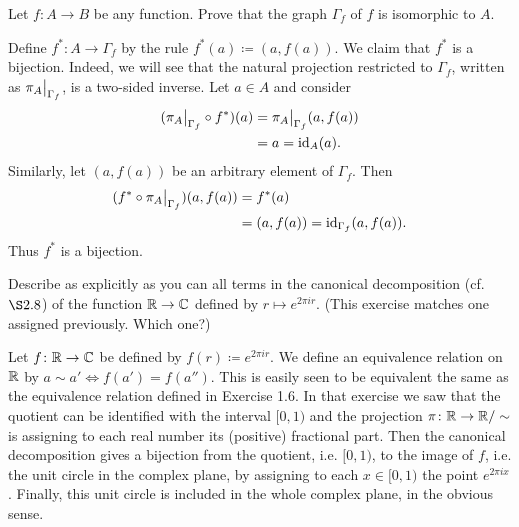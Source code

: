 \begin{exercise}
	Let \(f \colon A \to B\) be any function. Prove that the graph \(\Gamma_f\) of \(f\) is isomorphic to \(A\).
\end{exercise}
\begin{solution}
	Define $f^*\colon A \to \Gamma_f$ by the rule $f^*(a) \coloneqq (a,f(a))$. We claim that $f^*$ is a bijection. Indeed, we will see that the natural projection restricted to $\Gamma_f$, written as $\restr{\pi_A}{\Gamma_f}$, is a two-sided inverse. Let $a\in A$ and consider
	\begin{align*}
		(\restr{\pi_A}{\Gamma_f} \circ f^*)(a) &= \restr{\pi_A}{\Gamma_f}(a,f(a))\\
		&= a = \id_A(a).
	\end{align*}
	Similarly, let $(a,f(a))$ be an arbitrary element of $\Gamma_f$. Then
	\begin{align*}
		(f^*\circ \restr{\pi_A}{\Gamma_f})(a,f(a)) &= f^{*}(a)\\
		&= (a,f(a)) = \id_{\Gamma_f}(a,f(a)).
	\end{align*}
	Thus $f^*$ is a bijection.
\end{solution}

\begin{exercise}
	Describe as explicitly as you can all terms in the canonical decomposition (cf. \(\S 2.8\)) of the function \(\mathbb{R} \to \mathbb{C}\) defined by \(r \mapsto e^{2\pi ir}\). (This exercise matches one assigned previously. Which one?)
\end{exercise}
\begin{solution}
	Let $f \colon \mathbb{R} \to \mathbb{C}$ be defined by $f(r) \coloneqq e^{2\pi i r}$. We define an equivalence relation on $\mathbb{R}$ by $a\sim a' \iff f(a') = f(a'')$. This is easily seen to be equivalent the same as the equivalence relation defined in Exercise 1.6. In that exercise we saw that the quotient can be identified with the interval $[0,1)$ and the projection $\pi \colon \mathbb{R} \to \mathbb{R}/\sim$ is assigning to each real number its (positive) fractional part. Then the canonical decomposition gives a bijection from the quotient, i.e. $[0,1)$, to the image of $f$, i.e. the unit circle in the complex plane, by assigning to each $x \in [0,1)$ the point $e^{2\pi ix}$. Finally, this unit circle is included in the whole complex plane, in the obvious sense.
\end{solution}

